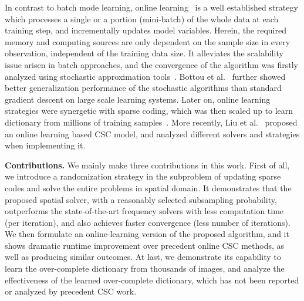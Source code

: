 In contrast to batch mode learning, online learning~\cite{shalev2012online} is a well established strategy which processes a single or a portion (mini-batch) of the whole data at each training step, and incrementally updates model variables. Herein, the required memory and computing sources are only dependent on the sample size in every observation, independent of the training data size. It alleviates the scalability issue arisen in batch approaches, and the convergence of the algorithm was firstly analyzed using stochastic approximation tools~\cite{bottou1998online}. Bottou et al.~\cite{bousquet2008tradeoffs} further showed better generalization performance of the stochastic algorithms than standard gradient descent on large scale learning systems. Later on, online learning strategies were synergetic with sparse coding, which was then scaled up to learn dictionary from millions of training samples~\cite{mairal2009online,mairal2010online}. More recently, Liu et al.~\cite{liu-2018-first} proposed an online learning based CSC model, and analyzed different solvers and strategies when implementing it.

{\bfseries Contributions.} We mainly make three contributions in this work. First of all, we introduce a randomization strategy in the subproblem of updating sparse codes and solve the entire problems in spatial domain. It demonstrates that the proposed spatial solver, with a reasonably selected subsampling probability, outperforms the state-of-the-art frequency solvers with less computation time (per iteration), and also achieves faster convergence (less number of iterations). We then formulate an online-learning version of the proposed algorithm, and it shows dramatic runtime improvement over precedent online CSC methods, as well as producing similar outcomes. At last, we demonstrate its capability to learn the over-complete dictionary from thousands of images, and analyze the effectiveness of the learned over-complete dictionary, which has not been reported or analyzed by precedent CSC work.